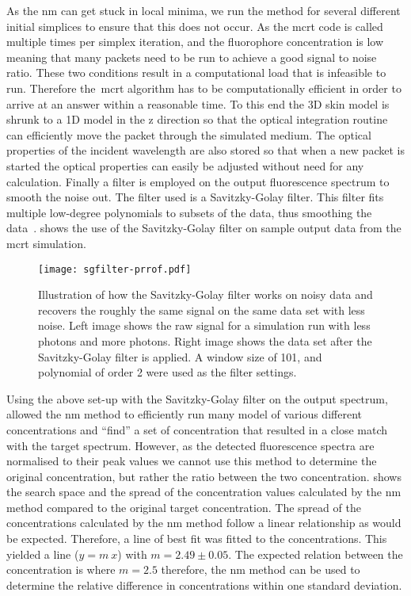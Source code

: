 As the \gls*{nm} can get stuck in local minima, we run the method for several different initial simplices to ensure that this does not occur.
As the \gls*{mcrt} code is called multiple times per simplex iteration, and the fluorophore concentration is low meaning that many packets need to be run to achieve a good signal to noise ratio.
These two conditions result in a computational load that is infeasible to run. 
Therefore the~\gls*{mcrt} algorithm has to be computationally efficient in order to arrive at an answer within a reasonable time.
To this end the 3D skin model is shrunk to a 1D model in the z direction so that the optical integration routine can efficiently move the packet through the simulated medium.
The optical properties of the incident wavelength are also stored so that when a new packet is started the optical properties can easily be adjusted without need for any calculation.
Finally a filter is employed on the output fluorescence spectrum to smooth the noise out.
The filter used is a Savitzky-Golay filter.
This filter fits multiple low-degree polynomials to subsets of the data, thus smoothing the data~\cite{press1990savitzky}. 
 shows the use of the Savitzky-Golay filter on sample output data from the \gls*{mcrt} simulation.

\begin{figure}[!htbp]
  \centering
  \texttt{[image: sgfilter-prrof.pdf]}
  \caption{Illustration of how the Savitzky-Golay filter works on noisy data and recovers the roughly the same signal on the same data set with less noise. Left image shows the raw signal for a simulation run with less photons and more photons. Right image shows the data set after the Savitzky-Golay filter is applied. A window size of 101, and polynomial of order 2 were used as the filter settings.}
  \label{fig:sgfilter}
\end{figure}


Using the above set-up with the Savitzky-Golay filter on the output spectrum, allowed the \gls*{nm} method to efficiently run many model of various different concentrations and ``find'' a set of concentration that resulted in a close match with the target spectrum.
However, as the detected fluorescence spectra are normalised to their peak values we cannot use this method to determine the original concentration, but rather the ratio between the two concentration.
 shows the search space and the spread of the concentration values calculated by the \gls*{nm} method compared to the original target concentration.
The spread of the concentrations calculated by the \gls*{nm} method follow a linear relationship as would be expected.
Therefore, a line of best fit was fitted to the concentrations.
This yielded a line ($y=m\ x$) with $m=2.49\pm0.05$.
The expected relation between the concentration is where $m =2.5$ therefore, the \gls*{nm} method can be used to determine the relative difference in concentrations within one standard deviation.


